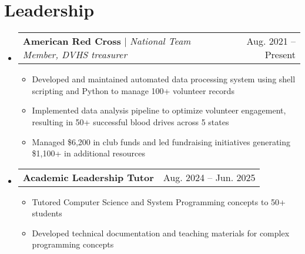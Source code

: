 \documentclass[letterpaper,11pt]{article}
\makeatletter
\newcommand{\resumeItem}[1]{
  \item\small{
    {#1 \vspace{-2pt}}
  }
}
\newcommand{\resumeProjectHeading}[2]{
    \item
    \begin{tabular*}{0.97\textwidth}{l@{\extracolsep{\fill}}r}
      \small#1 & #2 \\
    \end{tabular*}\vspace{-7pt}
}
\newcommand{\resumeSubHeadingListStart}{\begin{itemize}[leftmargin=0.15in, label={}]}
\newcommand{\resumeSubHeadingListEnd}{\end{itemize}}
\newcommand{\resumeItemListStart}{\begin{itemize}}
\newcommand{\resumeItemListEnd}{\end{itemize}\vspace{-5pt}}
\makeatother
\begin{document}
\section{Leadership}
    \resumeSubHeadingListStart
      \resumeProjectHeading
          {\textbf{American Red Cross} $|$ \emph{National Team Member, DVHS treasurer}}{Aug. 2021 -- Present}
          \resumeItemListStart
            \resumeItem{Developed and maintained automated data processing system using shell scripting and Python to manage 100+ volunteer records}
            \resumeItem{Implemented data analysis pipeline to optimize volunteer engagement, resulting in 50+ successful blood drives across 5 states}
            \resumeItem{Managed \$6,200 in club funds and led fundraising initiatives generating \$1,100+ in additional resources}
          \resumeItemListEnd
      \resumeProjectHeading
          {\textbf{Academic Leadership Tutor}}{Aug. 2024 -- Jun. 2025}
          \resumeItemListStart
            \resumeItem{Tutored Computer Science and System Programming concepts to 50+ students}
            \resumeItem{Developed technical documentation and teaching materials for complex programming concepts}
          \resumeItemListEnd
    \resumeSubHeadingListEnd

\end{document}
